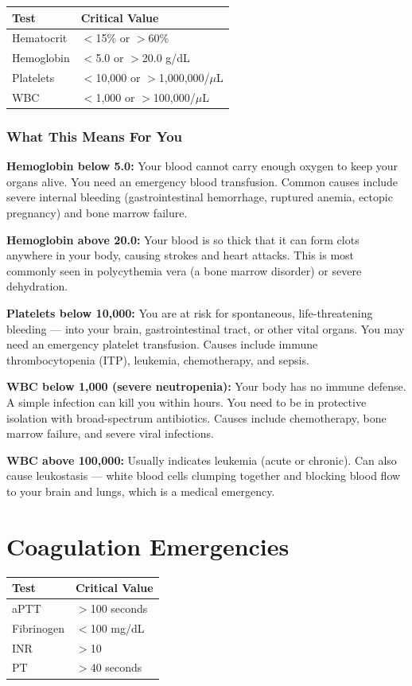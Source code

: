 \begin{longtable}{@{}ll@{}}
\toprule
\textbf{Test} & \textbf{Critical Value} \\
\midrule
Hematocrit & $<$15\% or $>$60\% \\
Hemoglobin & $<$5.0 or $>$20.0 g/dL \\
Platelets & $<$10,000 or $>$1,000,000/$\mu$L \\
WBC & $<$1,000 or $>$100,000/$\mu$L \\
\bottomrule
\end{longtable}

\subsubsection{What This Means For You}

\textbf{Hemoglobin below 5.0:} Your blood cannot carry enough oxygen to keep your organs alive. You need an emergency blood transfusion. Common causes include severe internal bleeding (gastrointestinal hemorrhage, ruptured anemia, ectopic pregnancy) and bone marrow failure.

\textbf{Hemoglobin above 20.0:} Your blood is so thick that it can form clots anywhere in your body, causing strokes and heart attacks. This is most commonly seen in polycythemia vera (a bone marrow disorder) or severe dehydration.

\textbf{Platelets below 10,000:} You are at risk for spontaneous, life-threatening bleeding --- into your brain, gastrointestinal tract, or other vital organs. You may need an emergency platelet transfusion. Causes include immune thrombocytopenia (ITP), leukemia, chemotherapy, and sepsis.

\textbf{WBC below 1,000 (severe neutropenia):} Your body has no immune defense. A simple infection can kill you within hours. You need to be in protective isolation with broad-spectrum antibiotics. Causes include chemotherapy, bone marrow failure, and severe viral infections.

\textbf{WBC above 100,000:} Usually indicates leukemia (acute or chronic). Can also cause leukostasis --- white blood cells clumping together and blocking blood flow to your brain and lungs, which is a medical emergency.

\clearpage
\section{Coagulation Emergencies}

\begin{longtable}{@{}ll@{}}
\toprule
\textbf{Test} & \textbf{Critical Value} \\
\midrule
aPTT & $>$100 seconds \\
Fibrinogen & $<$100 mg/dL \\
INR & $>$10 \\
PT & $>$40 seconds \\
\bottomrule
\end{longtable}

